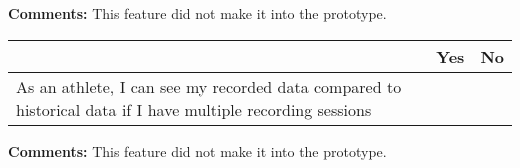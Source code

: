 \vspace{3mm}
\textbf{Comments:}
This feature did not make it into the prototype.
\vspace{3mm}


\begin{tabularx}{\textwidth}{|b|c|c|}
	\hline
	 & Yes & No \\
	\hline
	As an athlete, I can see my recorded data compared to historical data if I have multiple recording sessions &   & \xmark  \\
	\hline
\end{tabularx}

\vspace{3mm}
\textbf{Comments:}
This feature did not make it into the prototype.
\vspace{3mm}

